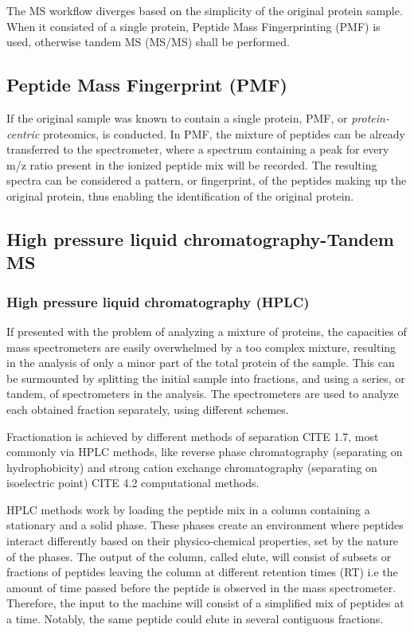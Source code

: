 \documentclass[11pt, a4paper]{report}
\begin{document}
The \ac{MS} workflow diverges based on the simplicity of the original protein sample. When it consisted of a single protein, Peptide Mass Fingerprinting (PMF) is used, otherwise tandem MS (MS/MS) shall be performed. 

\subsection{Peptide Mass Fingerprint (PMF)}
\label{subsec:pmf}

If the original sample was known to contain a single protein, PMF, or \textit{protein-centric} proteomics, is conducted. In PMF, the mixture of peptides can be already transferred to the spectrometer, where a spectrum containing a peak for every m/z ratio present in the ionized peptide mix will be recorded. The resulting spectra can be considered a pattern, or fingerprint, of the peptides making up the original protein, thus enabling the identification of the original protein.


\subsection{High pressure liquid chromatography-Tandem MS}
\label{subsec:ms2}

\subsubsection{High pressure liquid chromatography (HPLC)}

If presented with the problem of analyzing a mixture of proteins, the capacities of mass spectrometers are easily overwhelmed by a too complex mixture, resulting in the analysis of only a minor part of the total protein  of the sample. This can be surmounted by splitting the initial sample into fractions, and using a series, or tandem, of spectrometers in the analysis. The spectrometers are used to analyze each obtained fraction separately, using different schemes.

Fractionation is achieved by different methods of separation CITE 1.7, most commonly via \ac{HPLC} methods, like reverse phase chromatography (separating on hydrophobicity) and strong cation exchange chromatography (separating on isoelectric point) \cite{Barsnes2008} CITE 4.2 computational methods.

\ac{HPLC} methods work by loading the peptide mix in a column containing a stationary and a solid phase. These phases create an environment where peptides interact differently based on their physico-chemical properties, set by the nature of the phases. The output of the column, called elute, will consist of subsets or fractions of peptides leaving the column at different retention times (\ac{RT}) i.e the amount of time passed before the peptide is observed in the mass spectrometer. Therefore, the input to the machine will consist of a simplified mix of peptides at a time. Notably, the same peptide could elute in several contiguous fractions.
\end{document}
